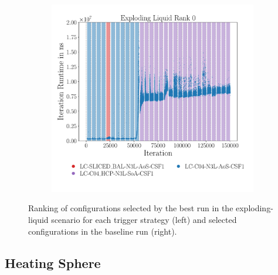 \begin{figure}[htpb]
\begin{subfigure}{0.5\textwidth}
	\end{subfigure}%
	\begin{subfigure}{0.5\textwidth}
		\centering
		\includegraphics[width=\textwidth]{./Figures/plots/exploding-liquid_configs_static.pdf}
		\vspace*{-1.075cm}
	\end{subfigure}
	\caption{Ranking of configurations selected by the best run in the exploding-liquid scenario for each trigger strategy (left) and selected configurations in the baseline run (right).}
	\label{fig:expl_optimality}
\end{figure}

\subsection{Heating Sphere}
